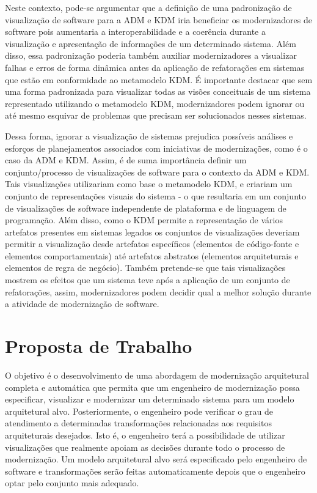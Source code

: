 \documentclass[12pt]{article}
\begin{document}
Neste contexto, pode-se argumentar que a definição de uma padronização de visualização de software para a ADM e KDM iria beneficiar os modernizadores de software pois aumentaria a interoperabilidade e a coerência durante a visualização e apresentação de informações de um determinado sistema. Além disso, essa padronização poderia também auxiliar modernizadores a visualizar falhas e erros  de forma dinâmica antes da aplicação de refatorações em sistemas que estão em conformidade ao metamodelo KDM. É importante destacar que sem uma forma padronizada para visualizar todas as visões conceituais de um sistema representado utilizando o metamodelo KDM, modernizadores podem ignorar ou até mesmo esquivar de problemas que precisam ser solucionados nesses sistemas. 

Dessa forma, ignorar a visualização de sistemas prejudica possíveis análises e esforços de planejamentos associados com iniciativas de modernizações, como é o caso da ADM e KDM. Assim, é de suma importância definir um conjunto/processo de visualizações de software para o contexto da ADM e KDM. Tais visualizações utilizariam como base o metamodelo KDM, e criariam um conjunto de representações visuais do sistema - o que resultaria em um conjunto de visualizações de software independente de plataforma e de linguagem de programação. Além disso, como o KDM permite a representação de vários artefatos presentes em sistemas legados os conjuntos de visualizações deveriam permitir a visualização desde artefatos específicos (elementos de código-fonte e elementos comportamentais) até artefatos abstratos (elementos arquiteturais e elementos de regra de negócio). Também pretende-se que tais visualizações mostrem os efeitos que um sistema teve após a aplicação de um conjunto de refatorações, assim, modernizadores podem decidir qual a melhor solução durante a atividade de modernização de software.

\section{Proposta de Trabalho}

O objetivo é o desenvolvimento de uma abordagem de modernização arquitetural completa e automática que permita que um engenheiro de modernização possa especificar, visualizar e modernizar um determinado sistema para um modelo arquitetural alvo. Posteriormente, o engenheiro pode verificar o grau de atendimento a determinadas transformações relacionadas aos requisitos arquiteturais desejados. Isto é, o engenheiro terá a possibilidade de utilizar visualizações que realmente apoiam as decisões durante todo o processo de modernização. Um modelo arquitetural alvo será especificado pelo engenheiro de software e transformações serão feitas automaticamente depois que o engenheiro optar pelo conjunto mais adequado.
\end{document}
